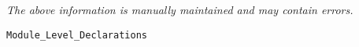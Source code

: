 \label{pkg:module\_level\_declarations}

{\tiny \it The above information is manually maintained and may contain errors.}
\begin{verbatim}
Module_Level_Declarations
\end{verbatim}
